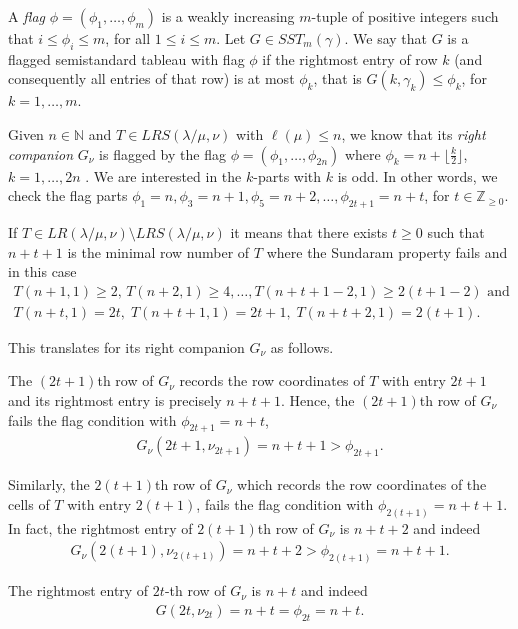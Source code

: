 \documentclass[reqno]{amsart}
\theoremstyle{tplain}
\begin{document}
A \emph{flag} $\phi=(\phi_1,\dots,\phi_m)$
is a weakly increasing $m$-tuple of positive integers such that $i\le \phi_i\le m$, for all $1\le i\le m$. Let $G\in SST_{m}(\gamma)$. We say that $G$ is a flagged semistandard tableau with flag $\phi$ if the rightmost entry of row $k$ (and consequently all entries of that row)   is at most $\phi_k$, that is $G(k,\gamma_k)\le \phi_k$, for $k=1,\dots,m$.

Given $n\in \mathbb{N}$ and  $T\in LRS(\lambda/\mu,\nu)$ with $\ell(\mu)\le n$,  we know that its \emph{right companion} $G_\nu$ is flagged by the flag $\phi=(\phi_1,\dots,\phi_{2n})$ where $\phi_k=n+\lfloor  \frac{k}{2}\rfloor$, $k=1,\dots,2n$ \cite{sathishtorres}. We are interested in the $k$-parts with $k$ is odd. In other words, we check the flag parts $\phi_1=n, \phi_3=n+1, \phi_5=n+2,\dots,\phi_{2t+1}=n+t$, for $t\in\mathbb{Z}_{\ge 0}$.

If $T\in LR(\lambda/\mu,\nu)\setminus LRS(\lambda/\mu,\nu)$ it means that there exists $t\ge 0$
such that
${n+t+1}$  is  the minimal row number of $T$ where the  Sundaram property  fails
and in this case   \begin{align*}T(n+1,1)\ge 2,\, T(n+2,1)\ge 4,\dots, T(n+t+1-2,1)\ge 2(t+1-2) \mbox{ and}\\
 T(n+t,1)=2t,\; T(n+t+1,1)= 2t+1,\; T(n+t+2,1)=2(t+1).%
 \end{align*}

 This translates for its right companion $G_\nu$ as follows.

 The $(2t+1)$th row of $G_\nu$  records the row coordinates of $T$ with entry $2t+1$ and its rightmost entry is precisely $n+t+1$. Hence, the $(2t+1)$th row of $G_\nu$ fails the flag condition with $\phi_{2t+1}=n+t$,
 \begin{align*}G_\nu(2t+1, \nu_{2t+1})=n+t+1>\phi_{2t+1}.\end{align*}

 Similarly, the $2(t+1)$th row of $G_\nu$ which records the row coordinates of the cells of $T$  with entry $2(t+1)$, fails the flag condition with $\phi_{2(t+1)}=n+t+1$. In fact, the rightmost entry of $2(t+1)$th row of $G_\nu$  is $n+t+2$ and indeed \begin{align*}G_\nu(2(t+1),\nu_{2(t+1)})=n+t+2>\phi_{2(t+1)}=n+t+1.\end{align*}

 The rightmost entry of $2t$-th row of $G_\nu$  is $n+t$ and indeed
 \begin{align*}G(2t,\nu_{2t})=n+t= \phi_{2t}=n+t.\end{align*}
\end{document}
